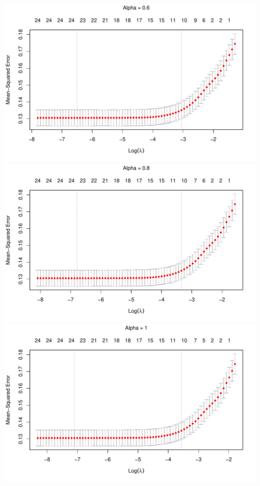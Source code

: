 \documentclass[
]{article}
\begin{document}
\includegraphics{A2_files/figure-latex/unnamed-chunk-8-4.pdf}
\includegraphics{A2_files/figure-latex/unnamed-chunk-8-5.pdf}
\includegraphics{A2_files/figure-latex/unnamed-chunk-8-6.pdf}
\end{document}
